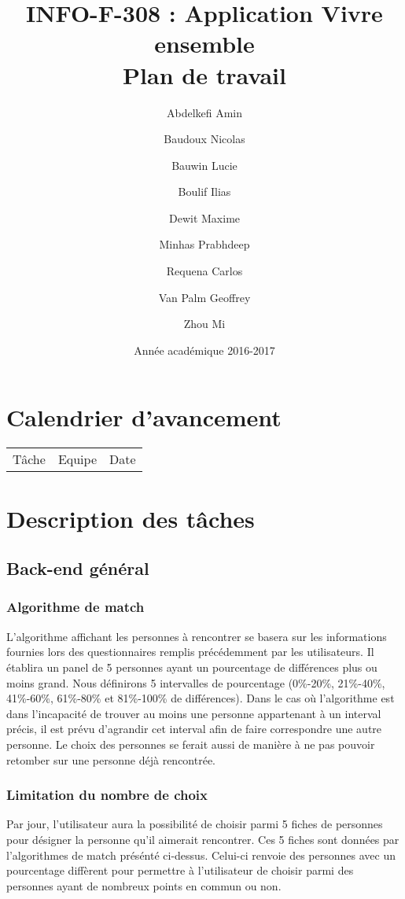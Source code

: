 \documentclass[10pt]{article}
\title{INFO-F-308 : Application Vivre ensemble \\ Plan de travail}
\author{Abdelkefi Amin \and Baudoux Nicolas \and Bauwin Lucie \and Boulif Ilias \and Dewit Maxime \and  Minhas Prabhdeep \and Requena Carlos \and Van Palm Geoffrey \and Zhou Mi}
\date{Année académique 2016-2017}
\begin{document}
 
 \maketitle
 \newpage
 \section{Calendrier d'avancement}
  \begin{tabular}{ l | c | r }
   Tâche & Equipe & Date \\ 
  \end{tabular}
 
 \section{Description des tâches} 
   
  \subsection{Back-end général}
   \subsubsection{Algorithme de match}
    L’algorithme affichant les personnes à rencontrer se basera sur les informations fournies lors des questionnaires remplis précédemment
    par les utilisateurs. 
    Il établira un panel de 5 personnes ayant un pourcentage de différences plus ou moins grand.
    Nous définirons 5 intervalles de pourcentage (0\%-20\%, 21\%-40\%, 41\%-60\%, 61\%-80\% et 81\%-100\% de différences).   
    Dans le cas où l’algorithme est dans l’incapacité de trouver au moins une personne appartenant à un interval précis,
    il est prévu d’agrandir cet interval afin de faire correspondre une autre personne.
    Le choix des personnes se ferait aussi de manière à ne pas pouvoir retomber sur une personne déjà rencontrée. 
   \subsubsection{Limitation du nombre de choix}
    Par jour, l'utilisateur aura la possibilité de choisir parmi 5 fiches de personnes pour désigner la personne qu'il aimerait rencontrer. 
    Ces 5 fiches sont données par l'algorithmes de match présénté ci-dessus. 
    Celui-ci renvoie des personnes avec un pourcentage diffèrent pour permettre à l'utilisateur de choisir parmi des personnes ayant de 
    nombreux points en commun ou non.    
\end{document}
